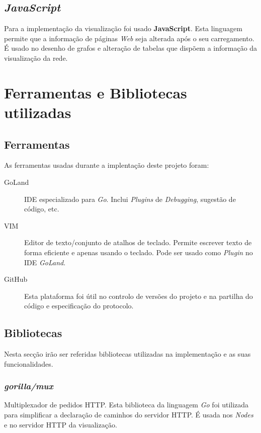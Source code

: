 \subsection*{\emph{JavaScript}}
Para a implementação da visualização foi usado \textbf{JavaScript}.
Esta linguagem permite que a informação de páginas \emph{Web} seja alterada após o seu carregamento.
É usado no desenho de grafos e alteração de tabelas que dispõem a informação da visualização da rede.



\section{Ferramentas e Bibliotecas utilizadas}
\subsection*{Ferramentas}
As ferramentas usadas durante a implentação deste projeto foram:
\begin{description}
    \item [GoLand] \acs{IDE} especializado para \emph{Go}. Inclui \emph{Plugins} de \emph{Debugging}, sugestão de código, etc.
    \item [VIM] Editor de texto/conjunto de atalhos de teclado. Permite escrever texto de forma eficiente e apenas usando o teclado. Pode ser usado como \emph{Plugin} no \acs{IDE} \emph{GoLand}.
    \item [GitHub] Esta plataforma foi útil no controlo de versões do projeto e na partilha do código e especificação do protocolo.
\end{description}

\subsection*{Bibliotecas}
\label{chap3:bibliotecas}
Nesta secção irão ser referidas bibliotecas utilizadas na implementação e as suas funcionalidades.

\subsubsection*{\emph{gorilla/mux}}
Multiplexador de pedidos \acs{HTTP}. Esta biblioteca da linguagem \emph{Go} foi utilizada para simplificar a declaração de caminhos do servidor \acs{HTTP}. É usada nos \emph{Nodes} e no servidor \acs{HTTP} da visualização.

